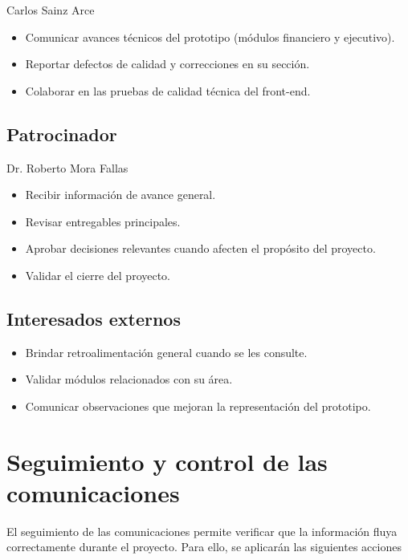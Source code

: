 \documentclass[11pt,spanish]{article}
\begin{document}
Carlos Sainz Arce

\begin{itemize}
    \item Comunicar avances técnicos del prototipo (módulos financiero y ejecutivo).
    \item Reportar defectos de calidad y correcciones en su sección.
    \item Colaborar en las pruebas de calidad técnica del front-end.
\end{itemize}

\subsection{Patrocinador}

Dr. Roberto Mora Fallas

\begin{itemize}
    \item Recibir información de avance general.
    \item Revisar entregables principales.
    \item Aprobar decisiones relevantes cuando afecten el propósito del proyecto.
    \item Validar el cierre del proyecto.
\end{itemize}

\subsection{Interesados externos}

\begin{itemize}
    \item Brindar retroalimentación general cuando se les consulte.
    \item Validar módulos relacionados con su área.
    \item Comunicar observaciones que mejoran la representación del prototipo.
\end{itemize}

\section{Seguimiento y control de las comunicaciones}

El seguimiento de las comunicaciones permite verificar que la información fluya correctamente durante el proyecto. Para ello, se aplicarán las siguientes acciones
\end{document}
